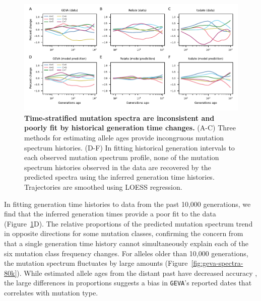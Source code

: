 \documentclass[]{article}
\newcommand{\GEVA}{\texttt{GEVA}\xspace}
\begin{document}
\begin{figure}[tb!]
    \centering
    \includegraphics{../plots/fig1.pdf}
    \caption{
        \textbf{Time-stratified mutation spectra are inconsistent and poorly
        fit by historical generation time changes.} (A-C) Three methods for
        estimating allele ages provide incongruous mutation spectrum histories.
        (D-F) In fitting historical generation intervals to each observed
        mutation spectrum profile, none of the mutation spectrum histories
        observed in the data are recovered by the predicted spectra using the
        inferred generation time histories. Trajectories are smoothed using
        LOESS regression.
    }
    \label{fig:spectrum-ages}
\end{figure}

In fitting generation time histories to data from the past 10,000 generations,
we find that the inferred generation times provide a poor fit to the data
(Figure~\ref{fig:spectrum-ages}D). The relative proportions of the predicted
mutation spectrum trend in opposite directions for some mutation classes,
confirming the concern from \citet{gao2022limited} that a single generation
time history cannot simultaneously explain each of the six mutation class
frequency changes. For alleles older than 10,000 generations, the mutation
spectrum fluctuates by large amounts (Figure~\ref{fig:geva-spectra-80k}). While
estimated allele ages from the distant past have decreased accuracy
\citep{albers2020dating,wang2023human}, the large differences in proportions
suggests a bias in \GEVA's reported dates that correlates with mutation type.
\end{document}
